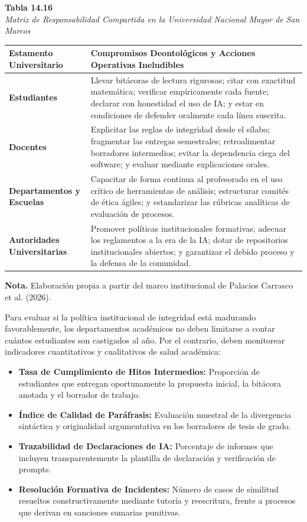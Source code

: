 \begin{table}[htbp]
\centering
\small
\renewcommand{\arraystretch}{1.25}
\textbf{Tabla 14.16}\\[0.15cm]
\textit{Matriz de Responsabilidad Compartida en la Universidad Nacional Mayor de San Marcos}\\[0.25cm]
\begin{tabularx}{\textwidth}{p{3.2cm}X}
\toprule
\textbf{Estamento Universitario} & \textbf{Compromisos Deontológicos y Acciones Operativas Ineludibles} \\
\midrule
\textbf{Estudiantes} & Llevar bitácoras de lectura rigurosas; citar con exactitud matemática; verificar empíricamente cada fuente; declarar con honestidad el uso de IA; y estar en condiciones de defender oralmente cada línea suscrita. \\
\textbf{Docentes} & Explicitar las reglas de integridad desde el sílabo; fragmentar las entregas semestrales; retroalimentar borradores intermedios; evitar la dependencia ciega del software; y evaluar mediante explicaciones orales. \\
\textbf{Departamentos y Escuelas} & Capacitar de forma continua al profesorado en el uso crítico de herramientas de análisis; estructurar comités de ética ágiles; y estandarizar las rúbricas analíticas de evaluación de procesos. \\
\textbf{Autoridades Universitarias} & Promover políticas institucionales formativas; adecuar los reglamentos a la era de la IA; dotar de repositorios institucionales abiertos; y garantizar el debido proceso y la defensa de la comunidad. \\
\bottomrule
\end{tabularx}
\vspace{0.15cm}
\raggedright \scriptsize \textbf{Nota.} Elaboración propia a partir del marco institucional de Palacios Carrasco et al. (2026).
\end{table}

Para evaluar si la política institucional de integridad está madurando favorablemente, los departamentos académicos no deben limitarse a contar cuántos estudiantes son castigados al año. Por el contrario, deben monitorear indicadores cuantitativos y cualitativos de salud académica:
\begin{itemize}
    \item \textbf{Tasa de Cumplimiento de Hitos Intermedios:} Proporción de estudiantes que entregan oportunamente la propuesta inicial, la bitácora anotada y el borrador de trabajo.
    \item \textbf{Índice de Calidad de Paráfrasis:} Evaluación muestral de la divergencia sintáctica y originalidad argumentativa en los borradores de tesis de grado.
    \item \textbf{Trazabilidad de Declaraciones de IA:} Porcentaje de informes que incluyen transparentemente la plantilla de declaración y verificación de prompts.
    \item \textbf{Resolución Formativa de Incidentes:} Número de casos de similitud resueltos constructivamente mediante tutoría y reescritura, frente a procesos que derivan en sanciones sumarias punitivas.
\end{itemize}

